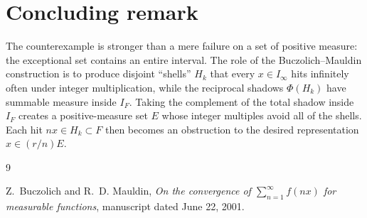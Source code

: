 \documentclass[11pt]{article}
\theoremstyle{remark}
\begin{document}
\section{Concluding remark}

The counterexample is stronger than a mere failure on a set of positive measure: the exceptional set contains an entire interval. The role of the Buczolich--Mauldin construction is to produce disjoint ``shells'' $H_k$ that every $x\in I_\infty$ hits infinitely often under integer multiplication, while the reciprocal shadows $\Phi(H_k)$ have summable measure inside $I_F$. Taking the complement of the total shadow inside $I_F$ creates a positive-measure set $E$ whose integer multiples avoid all of the shells. Each hit $nx\in H_k\subset F$ then becomes an obstruction to the desired representation $x\in (r/n)E$.

\begin{thebibliography}{9}

  Z.~Buczolich and R.~D. Mauldin,
  \emph{On the convergence of $\sum_{n=1}^{\infty} f(nx)$ for measurable functions},
  manuscript dated June 22, 2001.

\end{thebibliography}
\end{document}
